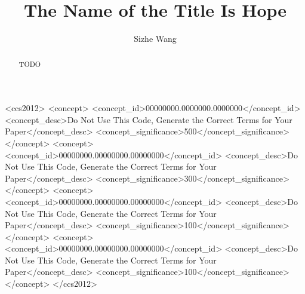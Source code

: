 \documentclass[acmlarge]{acmart}
\begin{document}
\title{The Name of the Title Is Hope}

\author{Sizhe Wang}

\renewcommand{\shortauthors}{Wang et al.}

\begin{abstract}
TODO
\end{abstract}

\begin{CCSXML}
<ccs2012>
 <concept>
  <concept_id>00000000.0000000.0000000</concept_id>
  <concept_desc>Do Not Use This Code, Generate the Correct Terms for Your Paper</concept_desc>
  <concept_significance>500</concept_significance>
 </concept>
 <concept>
  <concept_id>00000000.00000000.00000000</concept_id>
  <concept_desc>Do Not Use This Code, Generate the Correct Terms for Your Paper</concept_desc>
  <concept_significance>300</concept_significance>
 </concept>
 <concept>
  <concept_id>00000000.00000000.00000000</concept_id>
  <concept_desc>Do Not Use This Code, Generate the Correct Terms for Your Paper</concept_desc>
  <concept_significance>100</concept_significance>
 </concept>
 <concept>
  <concept_id>00000000.00000000.00000000</concept_id>
  <concept_desc>Do Not Use This Code, Generate the Correct Terms for Your Paper</concept_desc>
  <concept_significance>100</concept_significance>
 </concept>
</ccs2012>
\end{CCSXML}

\end{document}
